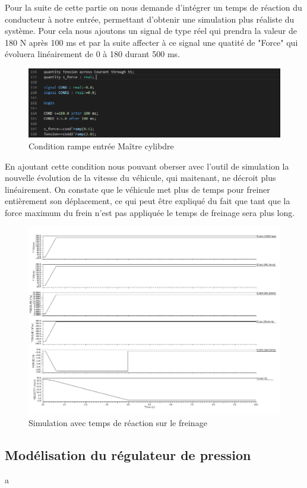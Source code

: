 Pour la suite de cette partie on nous demande d'intégrer un temps de réaction du conducteur à notre entrée, permettant d'obtenir une simulation plus réaliste du système. Pour cela nous ajoutons un signal de type réel qui prendra la valeur de 180 N après 100 ms et par la suite affecter à ce signal une quatité de "Force" qui évoluera linéairement de 0 à 180 durant 500 ms.
\begin{figure}[h]
    \centering
    \includegraphics[width=\textwidth]{images/cond.png}
    \caption{Condition rampe entrée Maître cylibdre}
\end{figure}
\newpage

En ajoutant cette condition nous pouvant oberser avec l'outil de simulation la nouvelle évolution de la vitesse du véhicule, qui maitenant, ne décroit plus linéairement. On constate que le véhicule met plus de temps pour freiner entièrement son déplacement, ce qui peut être expliqué du fait que tant que la force maximum du frein n'est pas appliquée le temps de freinage sera plus long.

\begin{figure}[h]
    \centering
    \includegraphics[width=\textwidth]{images/Instanciation_vehicule_roue_frein_Mc_rampe.jpg}
    \caption{Simulation avec temps de réaction sur le freinage}
\end{figure}

\newpage
\subsection{Modélisation du régulateur de pression}
a
\newpage
